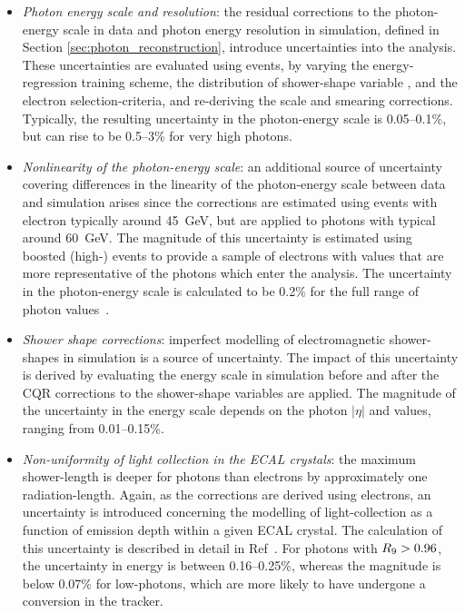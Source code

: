 \begin{itemize}
    \item \textit{Photon energy scale and resolution}: the residual corrections to the photon-energy scale in data and photon energy resolution in simulation, defined in Section \ref{sec:photon_reconstruction}, introduce uncertainties into the analysis. These uncertainties are evaluated using \Zee events, by varying the energy-regression training scheme, the distribution of shower-shape variable \RNINE, and the electron selection-criteria, and re-deriving the scale and smearing corrections. Typically, the resulting uncertainty in the photon-energy scale is 0.05--0.1\%, but can rise to be 0.5--3\% for very high \pt photons.
    
    \item \textit{Nonlinearity of the photon-energy scale}: an additional source of uncertainty covering differences in the linearity of the photon-energy scale between data and simulation arises since the corrections are estimated using \Zee events with electron \pt typically around 45~GeV, but are applied to photons with typical \pt around 60~GeV. The magnitude of this uncertainty is estimated using boosted (high-\pt) \Zee events to provide a sample of electrons with \pt values that are more representative of the photons which enter the analysis. The uncertainty in the photon-energy scale is calculated to be 0.2\% for the full range of photon \pt values~\cite{Khachatryan:2014ira}.
    
    \item \textit{Shower shape corrections}: imperfect modelling of electromagnetic shower-shapes in simulation is a source of uncertainty. The impact of this uncertainty is derived by evaluating the energy scale in simulation before and after the CQR corrections to the shower-shape variables are applied. The magnitude of the uncertainty in the energy scale depends on the photon $|\eta|$ and \RNINE values, ranging from 0.01--0.15\%.
    
    \item \textit{Non-uniformity of light collection in the ECAL crystals}: the maximum shower-length is deeper for photons than electrons by approximately one radiation-length. Again, as the corrections are derived using electrons, an uncertainty is introduced concerning the modelling of light-collection as a function of emission depth within a given ECAL crystal. The calculation of this uncertainty is described in detail in Ref~\cite{Sirunyan:2020xwk}. For photons with $R_9 > 0.96$, the uncertainty in energy is between 0.16--0.25\%, whereas the magnitude is below 0.07\% for low-\RNINE photons, which are more likely to have undergone a conversion in the tracker.
    

\end{itemize}
